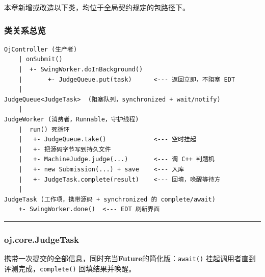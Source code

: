 \documentclass[
  11pt,
]{ctexart}
\begin{document}
本章新增或改造以下类，均位于全局契约规定的包路径下。

\hypertarget{ux7c7bux5173ux7cfbux603bux89c8-1}{%
\subsubsection{类关系总览}\label{ux7c7bux5173ux7cfbux603bux89c8-1}}

\begin{verbatim}
OjController (生产者)
    | onSubmit()
    |  +- SwingWorker.doInBackground()
    |       +- JudgeQueue.put(task)      <--- 返回立即，不阻塞 EDT
    |
JudgeQueue<JudgeTask>  (阻塞队列，synchronized + wait/notify)
    |
JudgeWorker (消费者，Runnable，守护线程)
    |  run() 死循环
    |   +- JudgeQueue.take()             <--- 空时挂起
    |   +- 把源码字节写到持久文件
    |   +- MachineJudge.judge(...)       <--- 调 C++ 判题机
    |   +- new Submission(...) + save    <--- 入库
    |   +- JudgeTask.complete(result)    <--- 回填，唤醒等待方
    |
JudgeTask (工作项，携带源码 + synchronized 的 complete/await)
    +- SwingWorker.done()  <--- EDT 刷新界面
\end{verbatim}

\begin{center}\rule{0.5\linewidth}{0.5pt}\end{center}

\hypertarget{oj.core.judgetask}{%
\subsubsection{oj.core.JudgeTask}\label{oj.core.judgetask}}

携带一次提交的全部信息，同时充当\textbf{Future}的简化版：\texttt{await()}
挂起调用者直到评测完成，\texttt{complete()} 回填结果并唤醒。
\end{document}
